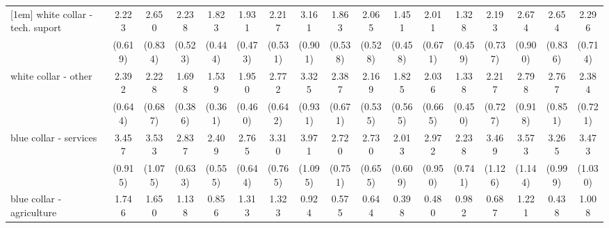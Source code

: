 {\begin{tabular}{l*{16}{c}}
[1em]
white collar - tech. suport&       2.223\sym{**} &       2.650\sym{**} &       2.238\sym{***}&       1.823\sym{*}  &       1.931\sym{**} &       2.217\sym{***}&       3.161\sym{***}&       1.863\sym{*}  &       2.065\sym{**} &       1.451         &       2.011\sym{*}  &       1.328         &       2.193\sym{*}  &       2.674\sym{**} &       2.654\sym{**} &       2.296\sym{**} \\
                    &     (0.619)         &     (0.834)         &     (0.523)         &     (0.444)         &     (0.473)         &     (0.531)         &     (0.901)         &     (0.538)         &     (0.528)         &     (0.458)         &     (0.671)         &     (0.459)         &     (0.737)         &     (0.900)         &     (0.836)         &     (0.714)         \\
[1em]
white collar - other&       2.392\sym{**} &       2.228\sym{**} &       1.698\sym{*}  &       1.539         &       1.950\sym{**} &       2.772\sym{***}&       3.325\sym{***}&       2.387\sym{**} &       2.169\sym{**} &       1.825         &       2.036\sym{*}  &       1.338         &       2.217\sym{*}  &       2.798\sym{**} &       2.767\sym{***}&       2.384\sym{**} \\
                    &     (0.644)         &     (0.687)         &     (0.386)         &     (0.361)         &     (0.460)         &     (0.642)         &     (0.931)         &     (0.671)         &     (0.535)         &     (0.565)         &     (0.665)         &     (0.450)         &     (0.727)         &     (0.918)         &     (0.851)         &     (0.721)         \\
[1em]
blue collar - services&       3.457\sym{***}&       3.533\sym{***}&       2.837\sym{***}&       2.409\sym{***}&       2.765\sym{***}&       3.310\sym{***}&       3.971\sym{***}&       2.720\sym{***}&       2.730\sym{***}&       2.013\sym{*}  &       2.972\sym{***}&       2.238\sym{*}  &       3.469\sym{***}&       3.573\sym{***}&       3.265\sym{***}&       3.473\sym{***}\\
                    &     (0.915)         &     (1.075)         &     (0.633)         &     (0.555)         &     (0.644)         &     (0.765)         &     (1.095)         &     (0.751)         &     (0.655)         &     (0.609)         &     (0.950)         &     (0.741)         &     (1.126)         &     (1.144)         &     (0.999)         &     (1.030)         \\
[1em]
blue collar - agriculture&       1.746         &       1.650         &       1.138         &       0.856         &       1.313         &       1.323         &       0.924         &       0.575         &       0.644         &       0.398         &       0.480         &       0.982         &       0.687         &       1.221         &       0.438         &       1.008         \\

\end{tabular}}

